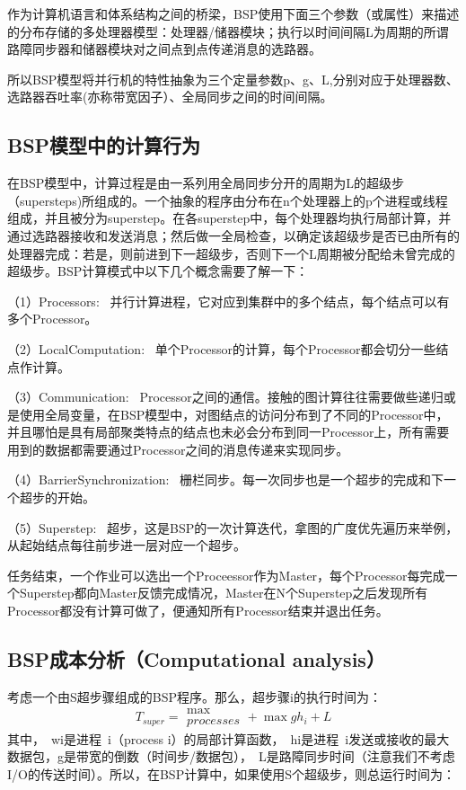 \documentclass[10pt,a4paper,twocolumn,twoside,UTF8]{ctexart}
\begin{document}
	作为计算机语言和体系结构之间的桥梁，BSP使用下面三个参数（或属性）来描述的分布存储的多处理器模型：处理器/储器模块；执行以时间间隔L为周期的所谓路障同步器和储器模块对之间点到点传递消息的选路器。\par
所以BSP模型将并行机的特性抽象为三个定量参数p、g、L,分别对应于处理器数、选路器吞吐率(亦称带宽因子）、全局同步之间的时间间隔。

	\subsection{BSP模型中的计算行为}
	在BSP模型中，计算过程是由一系列用全局同步分开的周期为L的超级步（supersteps)所组成的。一个抽象的程序由分布在n个处理器上的p个进程或线程组成，并且被分为superstep。在各superstep中，每个处理器均执行局部计算，并通过选路器接收和发送消息；然后做一全局检查，以确定该超级步是否已由所有的处理器完成：若是，则前进到下一超级步，否则下一个L周期被分配给未曾完成的超级步。BSP计算模式中以下几个概念需要了解一下：\par
	 {（1）Processors:}~ 并行计算进程，它对应到集群中的多个结点，每个结点可以有多个Processor。\par
	{（2）LocalComputation:}~ 单个Processor的计算，每个Processor都会切分一些结点作计算。\par
	{（3）Communication:}~ Processor之间的通信。接触的图计算往往需要做些递归或是使用全局变量，在BSP模型中，对图结点的访问分布到了不同的Processor中，并且哪怕是具有局部聚类特点的结点也未必会分布到同一Processor上，所有需要用到的数据都需要通过Processor之间的消息传递来实现同步。\par
	{（4）BarrierSynchronization:}~ 栅栏同步。每一次同步也是一个超步的完成和下一个超步的开始。\par
       {（5）Superstep:}~ 超步，这是BSP的一次计算迭代，拿图的广度优先遍历来举例，从起始结点每往前步进一层对应一个超步。\par
       任务结束，一个作业可以选出一个Proceessor作为Master，每个Processor每完成一个Superstep都向Master反馈完成情况，Master在N个Superstep之后发现所有Processor都没有计算可做了，便通知所有Processor结束并退出任务。
      
	

	\subsection{BSP成本分析（Computational analysis）}
	考虑一个由S超步骤组成的BSP程序。那么，超步骤i的执行时间为：
		\begin{equation}
		 T_{super} = \substack{\max\\processes} +\max gh_i + L  
		\end{equation}
	其中， wi是进程 i（process i）的局部计算函数， hi是进程 i发送或接收的最大数据包，g是带宽的倒数（时间步/数据包）， L是路障同步时间（注意我们不考虑I/O的传送时间）。所以，在BSP计算中，如果使用S个超级步，则总运行时间为：
	
\end{document}
